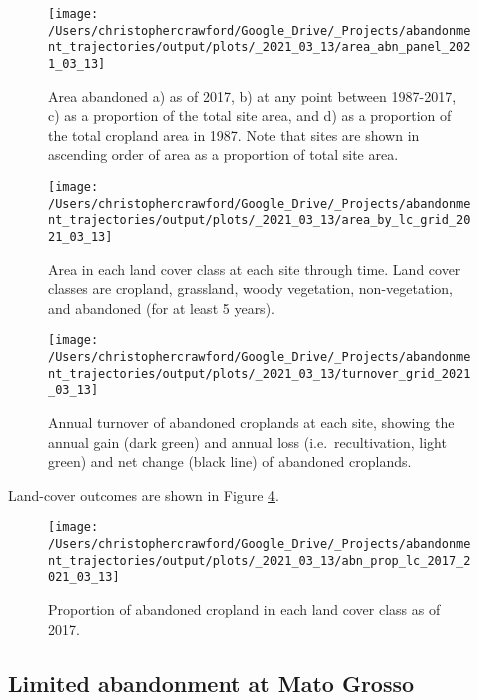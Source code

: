 \documentclass[9pt,twocolumn,twoside,]{pnas-new}
\begin{document}
\begin{figure}
\texttt{[image: /Users/christophercrawford/Google\_Drive/\_Projects/abandonment\_trajectories/output/plots/\_2021\_03\_13/area\_abn\_panel\_2021\_03\_13]} \caption{Area abandoned a) as of 2017, b) at any point between 1987-2017, c) as a proportion of the total site area, and d) as a proportion of the total cropland area in 1987. Note that sites are shown in ascending order of area as a proportion of total site area.}\label{fig:area-abn-panel}
\end{figure}



\begin{figure}
\texttt{[image: /Users/christophercrawford/Google\_Drive/\_Projects/abandonment\_trajectories/output/plots/\_2021\_03\_13/area\_by\_lc\_grid\_2021\_03\_13]} \caption{Area in each land cover class at each site through time. Land cover classes are cropland, grassland, woody vegetation, non-vegetation, and abandoned (for at least 5 years).}\label{fig:area-by-lc}
\end{figure}



\begin{figure}
\texttt{[image: /Users/christophercrawford/Google\_Drive/\_Projects/abandonment\_trajectories/output/plots/\_2021\_03\_13/turnover\_grid\_2021\_03\_13]} \caption{Annual turnover of abandoned croplands at each site, showing the annual gain (dark green) and annual loss (i.e.~recultivation, light green) and net change (black line) of abandoned croplands.}\label{fig:turnover-grid}
\end{figure}

Land-cover outcomes are shown in Figure \ref{fig:abn-prop-lc}.



\begin{figure}
\texttt{[image: /Users/christophercrawford/Google\_Drive/\_Projects/abandonment\_trajectories/output/plots/\_2021\_03\_13/abn\_prop\_lc\_2017\_2021\_03\_13]} \caption{Proportion of abandoned cropland in each land cover class as of 2017.}\label{fig:abn-prop-lc}
\end{figure}

\hypertarget{mato-grosso}{%
\subsection{Limited abandonment at Mato Grosso}\label{mato-grosso}}
\end{document}
